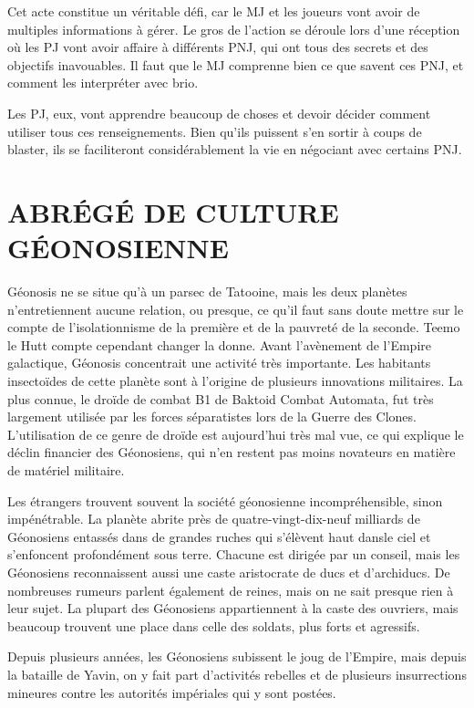 \documentclass[a4paper,10pt,twoside,twocolumn,openany]{book}
\begin{document}
Cet acte constitue un véritable défi, car le MJ et les
joueurs vont avoir de multiples informations à gérer. Le
gros de l’action se déroule lors d’une réception où les
PJ vont avoir affaire à différents PNJ, qui ont tous des
secrets et des objectifs inavouables. Il faut que le MJ
comprenne bien ce que savent ces PNJ, et comment les
interpréter avec brio.

Les PJ, eux, vont apprendre beaucoup de choses et
devoir décider comment utiliser tous ces renseignements. Bien qu’ils puissent s’en sortir à coups de blaster,
ils se faciliteront considérablement la vie en négociant
avec certains PNJ.

\section{ABRÉGÉ DE CULTURE
GÉONOSIENNE}
Géonosis ne se situe qu’à un parsec de Tatooine, mais
les deux planètes n’entretiennent aucune relation, ou
presque, ce qu’il faut sans doute mettre sur le compte
de l’isolationnisme de la première et de la pauvreté de
la seconde. Teemo le Hutt compte cependant changer la
donne. Avant l’avènement de l’Empire galactique, Géonosis concentrait une activité très importante. Les habitants
insectoïdes de cette planète sont à l’origine de plusieurs
innovations militaires. La plus connue, le droïde de combat B1 de Baktoid Combat Automata, fut très largement
utilisée par les forces séparatistes lors de la Guerre des
Clones. L’utilisation de ce genre de droïde est aujourd’hui
très mal vue, ce qui explique le déclin financier des Géonosiens, qui n’en restent pas moins novateurs en matière
de matériel militaire.

Les étrangers trouvent souvent la société géonosienne
incompréhensible, sinon impénétrable. La planète abrite
près de quatre-vingt-dix-neuf milliards de Géonosiens
entassés dans de grandes ruches qui s’élèvent haut dansle ciel et s’enfoncent profondément sous terre. Chacune
est dirigée par un conseil, mais les Géonosiens reconnaissent aussi une caste aristocrate de ducs et d’archiducs. De nombreuses rumeurs parlent également de
reines, mais on ne sait presque rien à leur sujet. La plupart des Géonosiens appartiennent à la caste des ouvriers, mais beaucoup trouvent une place dans celle des
soldats, plus forts et agressifs.

Depuis plusieurs années, les Géonosiens subissent le
joug de l’Empire, mais depuis la bataille de Yavin, on y fait
part d’activités rebelles et de plusieurs insurrections mineures contre les autorités impériales qui y sont postées.
\end{document}

